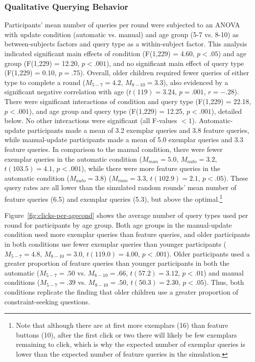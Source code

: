 \documentclass[man,floatsintext]{apa6}
\begin{document}
\subsubsection{Qualitative Querying Behavior}

Participants' mean number of queries per round were subjected to an ANOVA with update condition 
(automatic vs. manual) and age group (5-7 vs. 8-10) as between-subjects factors and query type as 
a within-subject factor. This analysis indicated significant main effects of condition (F(1,229) = 4.60, $p<.05$) 
and age group (F(1,229) = 12.20, $p<.001$), and no significant main effect of query type 
(F(1,229) = 0.10, $p=.75$). Overall, older children required fewer queries of either type to complete a 
round ($M_{5-7} = 4.2$, $M_{8-10} = 3.3$), also evidenced by a significant negative correlation 
with age ($t(119) = 3.24$, $p=.001$, $r=-.28$). There were significant interactions of condition 
and query type (F(1,229) = 22.18, $p<.001$), and age group and query type (F(1,229) = 12.25, 
$p<.001$), detailed below. No other interactions were significant (all F-values $<1$). Automatic-update participants made a mean of 3.2 exemplar queries and 3.8 feature queries, while manual-update participants made a mean of 5.0 exemplar queries and 3.3 feature queries. In comparison to the manual condition, 
there were fewer exemplar queries in the automatic condition ($M_{man} = 5.0$, 
$M_{auto} = 3.2$, $t(103.5)=4.1$, $p<.001$), while there were more feature queries 
in the automatic condition ($M_{auto} = 3.8$) ($M_{man} = 3.3$, $t(102.9)=2.1$, 
$p<.05$).
These query rates are all lower than the simulated random rounds' mean number of feature queries (6.5) and exemplar queries (5.3), but above the optimal.\footnote{Note that although there are at first more exemplars (16) than feature buttons (10), after the first click or two there will likely be few 
exemplars remaining to click, which is why the expected number of exemplar 
queries is lower than the expected number of feature queries in the simulation.} 

Figure~\ref{fig:clicks-per-agecond} shows the average number of query types used per 
round for participants by age group. Both age groups in the manual-update condition used 
more exemplar queries than feature queries, and older participants in both conditions use fewer exemplar queries than younger participants ($M_{5-7}=4.8$, $M_{8-10}=3.0$, $t(119.0)=4.00$, $p<.001$). Older participants used a greater proportion of feature queries than younger participants in both the automatic ($M_{5-7}=.50$ vs. $M_{8-10}=.66$, $t(57.2)=3.12$, $p<.01$) 
and manual conditions ($M_{5-7}=.39$ vs. $M_{8-10}=.50$, $t(50.3)=2.30$, $p<.05$). Thus, both 
conditions replicate the  finding that older children use a greater proportion of 
constraint-seeking questions. 
\end{document}
